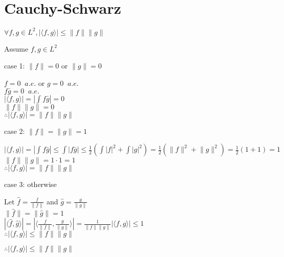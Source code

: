 \documentclass[letterpaper,12pt,fleqn]{article}
\newcommand{\abs}[1]{\left|#1\right|}
\newcommand{\norm}[1]{\lVert#1\rVert}
\newcommand{\inner}[2]{\langle#1,#2\rangle}
\newcommand{\conj}[1]{\bar{#1}}
\begin{document}
\section*{Cauchy-Schwarz}

\begin{theorem}
$\forall f,g\in L^2, \abs{\inner{f}{g}}\le\norm{f}\norm{g}$
\end{theorem}

\begin{theproof}
Assume $f,g\in L^2$

\begin{description}
\item{case 1: $\norm{f}=0$ or $\norm{g}=0$}

$f=0\;\;a.e.$ or $g=0\;\;a.e.$ \\
$f\conj{g}=0\;\;a.e.$ \\
$\abs{\inner{f}{g}}=\abs{\int f\conj{g}}=0$ \\
$\norm{f}\norm{g}=0$ \\
$\therefore \abs{\inner{f}{g}}=\norm{f}\norm{g}$

\item{case 2: $\norm{f}=\norm{g}=1$}

$\abs{\inner{f}{g}}=\abs{\int f\conj{g}}\le\int\abs{f\conj{g}}\le
    \frac{1}{2}\left(\int\abs{f}^2+\int\abs{g}^2\right)=
    \frac{1}{2}\left(\norm{f}^2+\norm{g}^2\right)=
    \frac{1}{2}(1+1)=1$ \\
$\norm{f}\norm{g}=1\cdot1=1$ \\
$\therefore \abs{\inner{f}{g}}=\norm{f}\norm{g}$

\item{case 3: otherwise}

Let $\hat{f}=\frac{f}{\norm{f}}$ and $\hat{g}=\frac{g}{\norm{g}}$ \\
$\norm{\hat{f}}=\norm{\hat{g}}=1$ \\
$\abs{\inner{\hat{f}}{\hat{g}}}=
    \abs{\inner{\frac{f}{\norm{f}}}{\frac{g}{\norm{g}}}}=
    \frac{1}{\norm{f}\norm{g}}\abs{\inner{f}{g}}\le1$ \\
$\therefore \abs{\inner{f}{g}}\le\norm{f}\norm{g}$
\end{description}

$\therefore \abs{\inner{f}{g}}\le\norm{f}\norm{g}$
\end{theproof}
\end{document}
